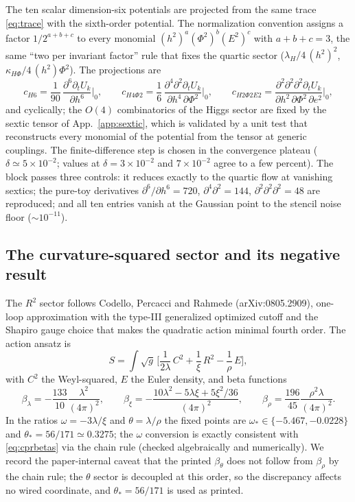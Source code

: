 \documentclass[11pt]{article}
\newcommand{\dt}{\partial_t}
\begin{document}
The ten scalar dimension-six potentials are projected from the same trace
\eqref{eq:trace} with the sixth-order potential.  The normalization
convention assigns a factor $1/2^{a+b+c}$ to every monomial
$(h^2)^a(\Phi^2)^b(E^2)^c$ with $a+b+c=3$, the same ``two per invariant
factor'' rule that fixes the quartic sector ($\lambda_H/4\,(h^2)^2$,
$\kappa_{H\Phi}/4\,(h^2)\Phi^2$).  The projections are
\begin{equation}
  \label{eq:sexticprojections}
  c_{H6}=\frac{1}{90}\,\frac{\partial^6\dt U_k}{\partial h^6}\Big|_0,\qquad
  c_{H4\Phi2}=\frac{1}{6}\,\frac{\partial^4\partial^2\dt U_k}
  {\partial h^4\,\partial\Phi^2}\Big|_0,\qquad
  c_{H2\Phi2E2}=\frac{\partial^2\partial^2\partial^2\dt U_k}
  {\partial h^2\,\partial\Phi^2\,\partial e^2}\Big|_0,
\end{equation}
and cyclically; the $O(4)$ combinatorics of the Higgs sector are fixed by the
sextic tensor of App.~\ref{app:sextic}, which is validated by a unit test
that reconstructs every monomial of the potential from the tensor at
generic couplings.  The finite-difference step is chosen in the convergence
plateau ($\delta\simeq 5\times10^{-2}$; values at $\delta=3\times10^{-2}$ and
$7\times10^{-2}$ agree to a few percent).  The block passes three controls:
it reduces exactly to the quartic flow at vanishing sextics; the pure-toy
derivatives $\partial^6/\partial h^6=720$, $\partial^4\partial^2=144$,
$\partial^2\partial^2\partial^2=48$ are reproduced; and all ten entries
vanish at the Gaussian point to the stencil noise floor
($\sim 10^{-11}$).

\subsection{The curvature-squared sector and its negative result}
\label{sec:r2}

The $R^2$ sector follows Codello, Percacci and Rahmede
\cite{cpr09} (arXiv:0805.2909), one-loop approximation with the type-III
generalized optimized cutoff and the Shapiro gauge choice that makes the
quadratic action minimal fourth order.  The action ansatz is
\begin{equation}
  \label{eq:cpr}
  S=\int \sqrt{g}\,\Big[
    \frac{1}{2\lambda}\,C^2+\frac{1}{\xi}\,R^2-\frac{1}{\rho}\,E\Big],
\end{equation}
with $C^2$ the Weyl-squared, $E$ the Euler density, and beta functions
\begin{equation}
  \label{eq:cprbetas}
  \beta_\lambda=-\frac{133}{10}\frac{\lambda^2}{(4\pi)^2},\qquad
  \beta_\xi=-\frac{10\lambda^2-5\lambda\xi+5\xi^2/36}{(4\pi)^2},\qquad
  \beta_\rho=\frac{196}{45}\frac{\rho^2\lambda}{(4\pi)^2}.
\end{equation}
In the ratios $\omega=-3\lambda/\xi$ and $\theta=\lambda/\rho$ the fixed
points are $\omega_*\in\{-5.467,-0.0228\}$ and $\theta_*=56/171\simeq 0.3275$;
the $\omega$ conversion is exactly consistent with \eqref{eq:cprbetas} via the
chain rule (checked algebraically and numerically).  We record the
paper-internal caveat that the printed $\beta_\theta$ does not follow from
$\beta_\rho$ by the chain rule; the $\theta$ sector is decoupled at this
order, so the discrepancy affects no wired coordinate, and
$\theta_*=56/171$ is used as printed.
\end{document}
